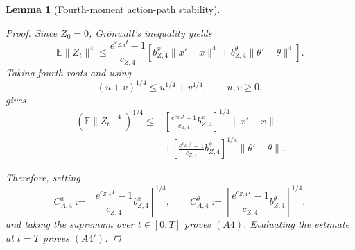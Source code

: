 \documentclass{article}
\newtheorem{lem}[thm]{Lemma}
\theoremstyle{definition}
\theoremstyle{remark}
\theoremstyle{mystyle}
\newcommand{\1}{\mathbbm{1}}
\begin{document}
\begin{lem}[Fourth-moment action-path stability]
\begin{proof}
Since \(Z_0=0\), Gr\"onwall's inequality yields
\[
\mathbb E\|Z_t\|^4
\le
\frac{e^{c_{Z,4}t}-1}{c_{Z,4}}
\left[
b_{Z,4}^x\|x'-x\|^4
+
b_{Z,4}^\theta\|\theta'-\theta\|^4
\right].
\tag{12}
\]
Taking fourth roots and using
\[
(u+v)^{1/4}\le u^{1/4}+v^{1/4},
\qquad u,v\ge0,
\]
gives
\[
\begin{aligned}
\left(\mathbb E\|Z_t\|^4\right)^{1/4}
\le{}&
\left[
\frac{e^{c_{Z,4}t}-1}{c_{Z,4}}
b_{Z,4}^x
\right]^{1/4}
\|x'-x\|\\
&+
\left[
\frac{e^{c_{Z,4}t}-1}{c_{Z,4}}
b_{Z,4}^\theta
\right]^{1/4}
\|\theta'-\theta\|.
\end{aligned}
\tag{13}
\]

Therefore, setting
\[
C_{A,4}^x
:=
\left[
\frac{e^{c_{Z,4}T}-1}{c_{Z,4}}
b_{Z,4}^x
\right]^{1/4},
\qquad
C_{A,4}^\theta
:=
\left[
\frac{e^{c_{Z,4}T}-1}{c_{Z,4}}
b_{Z,4}^\theta
\right]^{1/4},
\tag{14}
\]
and taking the supremum over \(t\in[0,T]\) proves \((A4)\).
Evaluating the estimate at \(t=T\) proves \((A4')\).

\end{proof}
\end{lem}
\end{document}
